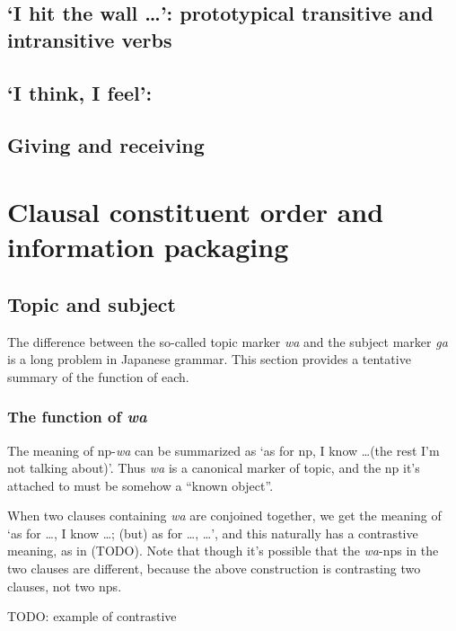 \documentclass[UTF8, a4paper, oneside, scheme=plain]{ctexrep}
\newcommand{\corpus}[1]{\emph{#1}}
\newcommand{\translate}[1]{`#1'}
\begin{document}
\section{\translate{I hit the wall \dots}: prototypical transitive and intransitive verbs}

\section{\translate{I think, I feel}: }

\section{Giving and receiving}\label{sec:giving-and-receiving}

\chapter{Clausal constituent order and information packaging}

\section{Topic and subject}\label{sec:topic-subject}

The difference between the so-called topic marker \corpus{wa} and the subject marker \corpus{ga}
is a long problem in Japanese grammar.
This section provides a tentative summary of the function of each.

\subsection{The function of \corpus{wa}}\label{sec:wa-topic}

The meaning of \ac{np}-\corpus{wa} can be summarized as 
\translate{as for \ac{np}, I know \dots (the rest I'm not talking about)}.
Thus \corpus{wa} is a canonical marker of topic,
and the \ac{np} it's attached to must be somehow a ``known object''.

When two clauses containing \corpus{wa} are conjoined together,
we get the meaning of 
\translate{as for \dots, I know \dots; (but) as for \dots, \dots},
and this naturally has a contrastive meaning, as in (TODO).
Note that though it's possible that the \corpus{wa}-\ac{np}s in the two clauses are different,
because the above construction is contrasting two clauses, not two \ac{np}s.

\begin{exe}
    \ex TODO: example of contrastive  
\end{exe}
\end{document}
